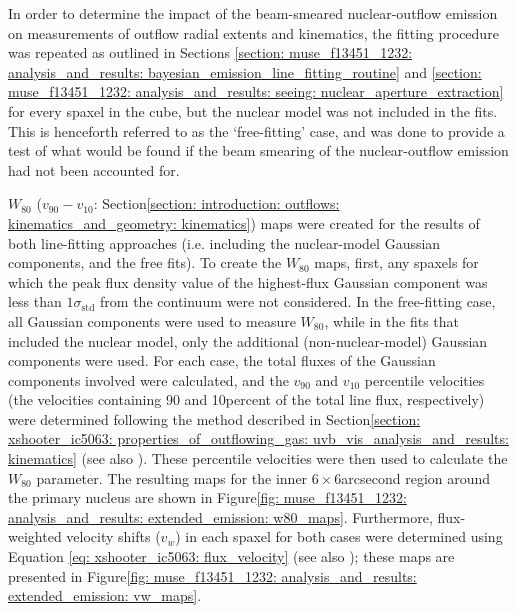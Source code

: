 In order to determine the impact of the beam-smeared nuclear-outflow emission on measurements of outflow radial extents and kinematics, the fitting procedure was repeated as outlined in Sections \ref{section: muse_f13451_1232: analysis_and_results: bayesian_emission_line_fitting_routine} and \ref{section: muse_f13451_1232: analysis_and_results: seeing: nuclear_aperture_extraction} for every spaxel in the cube, but the nuclear model was not included in the fits. This is henceforth referred to as the `free-fitting' case, and was done to provide a test of what would be found if the beam smearing of the nuclear-outflow emission had not been accounted for.

$W_\mathrm{80}$ ($v_\mathrm{90}-v_\mathrm{10}$: Section\;\ref{section: introduction: outflows: kinematics_and_geometry: kinematics}) maps were created for the results of both line-fitting approaches (i.e. including the nuclear-model Gaussian components, and the free fits). To create the $W_\mathrm{80}$ maps, first, any spaxels for which the peak flux density value of the highest-flux Gaussian component was less than $1\sigma_\mathrm{std}$ from the continuum were not considered. In the free-fitting case, all Gaussian components were used to measure $W_\mathrm{80}$, while in the fits that included the nuclear model, only the additional (non-nuclear-model) Gaussian components were used. For each case, the total fluxes of the Gaussian components involved were calculated, and the $v_\mathrm{90}$ and $v_\mathrm{10}$ percentile velocities (the velocities containing 90 and 10\;per\;cent of the total line flux, respectively) were determined following the method described in Section\;\ref{section: xshooter_ic5063: properties_of_outflowing_gas: uvb_vis_analysis_and_results: kinematics} (see also \citealt{Rose2018}). These percentile velocities were then used to calculate the $W_\mathrm{80}$ parameter. The resulting maps for the inner $6\times6$\;arcsecond region around the primary nucleus are shown in Figure\;\ref{fig: muse_f13451_1232: analysis_and_results: extended_emission: w80_maps}. Furthermore, flux-weighted velocity shifts ($v_w$) in each spaxel for both cases were determined using Equation \ref{eq: xshooter_ic5063: flux_velocity} (see also \citealt{Rose2018}); these maps are presented in Figure\;\ref{fig: muse_f13451_1232: analysis_and_results: extended_emission: vw_maps}.

